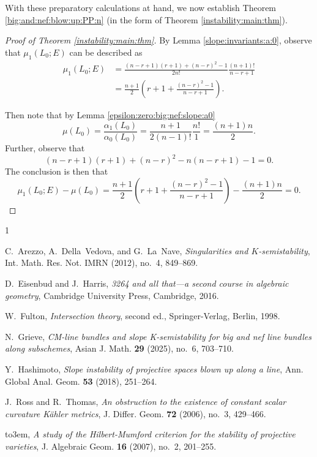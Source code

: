\documentclass[10pt,letterpaper]{amsart}
\theoremstyle{definition}
\numberwithin{equation}{section}
\begin{document}
With these preparatory calculations at hand, we now establish Theorem \ref{big:and:nef:blow:up:PP:n} (in the form of Theorem \ref{instability:main:thm}).

\begin{proof}[Proof of Theorem \ref{instability:main:thm}]
By Lemma \ref{slope:invariants:a:0}, observe that $\mu_1(L_0;E)$ can be described as
\begin{align*}
\mu_1(L_0;E) & = \frac{(n-r+1)(r+1)+(n-r)^2 -1}{2 n!} \frac{(n+1)!}{n-r+1} \\
&= \frac{n+1}{2}\left( r+1 + \frac{(n-r)^2 - 1 }{n-r+1} \right) \text{.}
\end{align*}

Then note that by Lemma \ref{epsilon:zero:big:nef:slope:a0}
$$
\mu(L_0) = \frac{\alpha_1(L_0)}{\alpha_0(L_0)} = \frac{n+1}{2(n-1)!} \frac{n!}{1} = \frac{(n+1)n}{2}  \text{.}
$$
Further, observe that
$$
(n-r+1)(r+1) + (n-r)^2 - n(n-r+1) - 1 = 0 \text{.}
$$
The conclusion is then that
$$
\mu_1(L_0;E) - \mu(L_0)  = \frac{n+1}{2} \left(r+1 + \frac{(n-r)^2- 1}{n-r+1} \right) - \frac{(n+1)n}{2} = 0 \text{.}
$$
\end{proof}

\providecommand{\bysame}{\leavevmode\hbox to3em{\hrulefill}\thinspace}
\providecommand{\MR}{\relax\ifhmode\unskip\space\fi MR }
\providecommand{\MRhref}[2]{%
  \href{http://www.ams.org/mathscinet-getitem?mr=#1}{#2}
}
\providecommand{\href}[2]{#2}
\begin{thebibliography}{1}

C.~Arezzo, A.~Della~Vedova, and G.~La~Nave, \emph{Singularities and
  {$K$}-semistability}, Int. Math. Res. Not. IMRN (2012), no.~4, 849--869.

D.~Eisenbud and J.~Harris, \emph{3264 and all that---a second course in
  algebraic geometry}, Cambridge University Press, Cambridge, 2016.

W.~Fulton, \emph{Intersection theory}, second ed., Springer-Verlag, Berlin,
  1998.

N.~Grieve, \emph{{CM}-line bundles and slope {K}-semistability for big and nef
  line bundles along subschemes}, Asian J. Math. \textbf{29} (2025), no.~6,
  703--710.

Y.~Hashimoto, \emph{Slope instability of projective spaces blown up along a
  line}, Ann. Global Anal. Geom. \textbf{53} (2018), 251--264.

J.~Ross and R.~Thomas, \emph{An obstruction to the existence of constant scalar
  curvature {K}\"{a}hler metrics}, J. Differ. Geom. \textbf{72} (2006), no.~3,
  429--466.

\bysame, \emph{A study of the {H}ilbert-{M}umford criterion for the stability
  of projective varieties}, J. Algebraic Geom. \textbf{16} (2007), no.~2,
  201--255.

\end{thebibliography}
\end{document}
